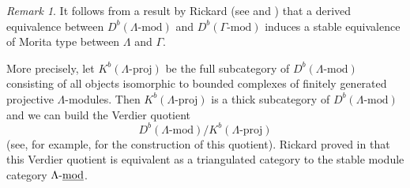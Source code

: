 \documentclass{amsart}
\theoremstyle{plain}
\theoremstyle{definition}
\theoremstyle{remark}
\newtheorem{rem}[thm]{Remark}
\begin{document}
\begin{rem}
\label{rem:rickardagain}
It follows from a result by Rickard (see \cite[Cor. 5.5]{rickard1} and \cite[Prop. 6.3.8]{kozim}) that a derived 
equivalence between $D^b(\Lambda\mbox{-{mod}})$ and $D^b(\Gamma\mbox{-{mod}})$ induces
a stable equivalence of Morita type between $\Lambda$ and $\Gamma$.

More precisely,
let $K^{b}(\Lambda\mbox{-proj})$ be the full subcategory of $D^b(\Lambda\mbox{-{mod}})$
consisting of all objects isomorphic to bounded complexes of finitely generated projective
$\Lambda$-modules. Then $K^{b}(\Lambda\mbox{-proj})$ is a thick subcategory of
$D^b(\Lambda\mbox{-{mod}})$ and we can build the Verdier quotient
$$D^b(\Lambda\mbox{-{mod}})/K^{b}(\Lambda\mbox{-proj})$$
(see, for example, \cite[Sect. 4.6]{krause2008} for the construction of this quotient).
Rickard proved in \cite[Thm. 2.1]{rickardJPAA1989} that this Verdier quotient is equivalent
as a triangulated category to the stable module category $\Lambda\mbox{-\underline{mod}}$.


\end{rem}
\end{document}
